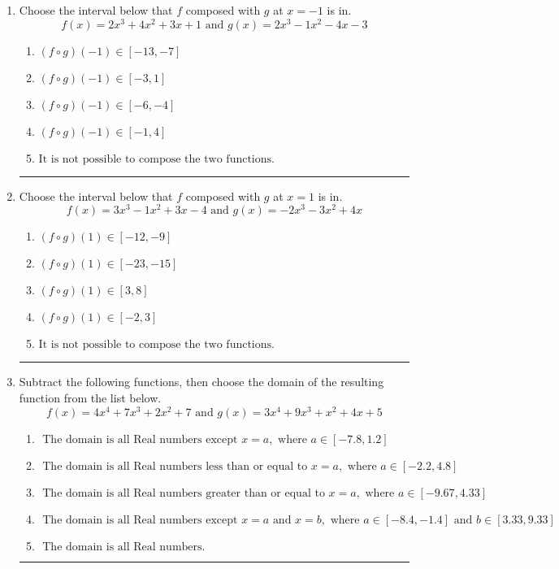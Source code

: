 \documentclass[14pt]{extbook}
\newcommand{\litem}[1]{\item#1\hspace*{-1cm}\rule{\textwidth}{0.4pt}}
\begin{document}
\begin{enumerate}
\litem{
Choose the interval below that $f$ composed with $g$ at $x=-1$ is in.\[ f(x) = 2x^{3} +4 x^{2} +3 x + 1 \text{ and } g(x) = 2x^{3} -1 x^{2} -4 x -3 \]\begin{enumerate}[label=\Alph*.]
\item \( (f \circ g)(-1) \in [-13, -7] \)
\item \( (f \circ g)(-1) \in [-3, 1] \)
\item \( (f \circ g)(-1) \in [-6, -4] \)
\item \( (f \circ g)(-1) \in [-1, 4] \)
\item \( \text{It is not possible to compose the two functions.} \)

\end{enumerate} }
\litem{
Choose the interval below that $f$ composed with $g$ at $x=1$ is in.\[ f(x) = 3x^{3} -1 x^{2} +3 x -4 \text{ and } g(x) = -2x^{3} -3 x^{2} +4 x \]\begin{enumerate}[label=\Alph*.]
\item \( (f \circ g)(1) \in [-12, -9] \)
\item \( (f \circ g)(1) \in [-23, -15] \)
\item \( (f \circ g)(1) \in [3, 8] \)
\item \( (f \circ g)(1) \in [-2, 3] \)
\item \( \text{It is not possible to compose the two functions.} \)

\end{enumerate} }
\litem{
Subtract the following functions, then choose the domain of the resulting function from the list below.\[ f(x) = 4x^{4} +7 x^{3} +2 x^{2} + 7 \text{ and } g(x) = 3x^{4} +9 x^{3} + x^{2} +4 x + 5 \]\begin{enumerate}[label=\Alph*.]
\item \( \text{ The domain is all Real numbers except } x = a, \text{ where } a \in [-7.8, 1.2] \)
\item \( \text{ The domain is all Real numbers less than or equal to } x = a, \text{ where } a \in [-2.2, 4.8] \)
\item \( \text{ The domain is all Real numbers greater than or equal to } x = a, \text{ where } a \in [-9.67, 4.33] \)
\item \( \text{ The domain is all Real numbers except } x = a \text{ and } x = b, \text{ where } a \in [-8.4, -1.4] \text{ and } b \in [3.33, 9.33] \)
\item \( \text{ The domain is all Real numbers. } \)


\end{enumerate}}
\end{enumerate}
\end{document}
